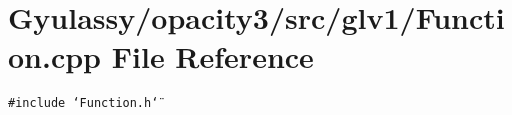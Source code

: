 \section{Gyulassy/opacity3/src/glv1/Function.cpp File Reference}
\label{Function_8cpp}
{\tt \#include \char`\"{}Function.h\char`\"{}}\par
